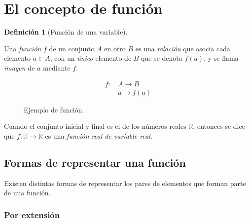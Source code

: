 \documentclass[
  a4paper,
]{scrreport}
\theoremstyle{plain}
\theoremstyle{plain}
\theoremstyle{definition}
\newtheorem{definition}{Definición}[chapter]
\theoremstyle{definition}
\theoremstyle{plain}
\theoremstyle{remark}
\begin{document}
\hypertarget{el-concepto-de-funciuxf3n}{%
\section{El concepto de función}\label{el-concepto-de-funciuxf3n}}

\leavevmode{}%
\begin{definition}[Función de una variable]\label{def-funcion-real}

Una \emph{función} \(f\) de un conjunto \(A\) en otro \(B\) es una
\emph{relación} que asocia cada elemento \(a\in A\), con un \emph{único}
elemento de \(B\) que se denota \(f(a)\), y se llama \emph{imagen} de
\(a\) mediante \(f\).

\begin{align*}
f:\,&A\longrightarrow B\\
&a\longrightarrow f(a)
\end{align*}

\end{definition}

\begin{figure}

{\centering 



}

\caption{Ejemplo de función.}

\end{figure}

Cuando el conjunto inicial y final es el de los números reales
\(\mathbb{R}\), entonces se dice que
\(f:\mathbb{R}\rightarrow \mathbb{R}\) es una \emph{función real de
variable real}.

\hypertarget{formas-de-representar-una-funciuxf3n}{%
\subsection{Formas de representar una
función}\label{formas-de-representar-una-funciuxf3n}}

Existen distintas formas de representar los pares de elementos que
forman parte de una función.

\hypertarget{por-extensiuxf3n}{%
\subsubsection*{Por extensión}\label{por-extensiuxf3n}}
\end{document}
